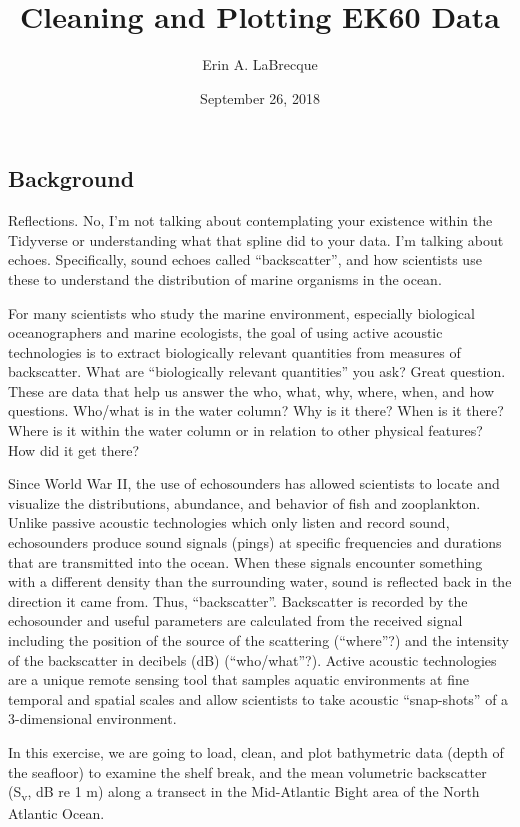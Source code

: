 \documentclass[]{article}
\title{Cleaning and Plotting EK60 Data}
\author{Erin A. LaBrecque}
\date{September 26, 2018}
\begin{document}
\maketitle

\hypertarget{background}{%
\subsection{Background}\label{background}}

Reflections. No, I'm not talking about contemplating your existence
within the Tidyverse or understanding what that spline did to your data.
I'm talking about echoes. Specifically, sound echoes called
``backscatter'', and how scientists use these to understand the
distribution of marine organisms in the ocean.

For many scientists who study the marine environment, especially
biological oceanographers and marine ecologists, the goal of using
active acoustic technologies is to extract biologically relevant
quantities from measures of backscatter. What are ``biologically
relevant quantities'' you ask? Great question. These are data that help
us answer the who, what, why, where, when, and how questions. Who/what
is in the water column? Why is it there? When is it there? Where is it
within the water column or in relation to other physical features? How
did it get there?

Since World War II, the use of echosounders has allowed scientists to
locate and visualize the distributions, abundance, and behavior of fish
and zooplankton. Unlike passive acoustic technologies which only listen
and record sound, echosounders produce sound signals (pings) at specific
frequencies and durations that are transmitted into the ocean. When
these signals encounter something with a different density than the
surrounding water, sound is reflected back in the direction it came
from. Thus, ``backscatter''. Backscatter is recorded by the echosounder
and useful parameters are calculated from the received signal including
the position of the source of the scattering (``where''?) and the
intensity of the backscatter in decibels (dB) (``who/what''?). Active
acoustic technologies are a unique remote sensing tool that samples
aquatic environments at fine temporal and spatial scales and allow
scientists to take acoustic ``snap-shots'' of a 3-dimensional
environment.

In this exercise, we are going to load, clean, and plot bathymetric data
(depth of the seafloor) to examine the shelf break, and the mean
volumetric backscatter (S\textsubscript{v}, dB re 1 m) along a transect
in the Mid-Atlantic Bight area of the North Atlantic Ocean.
\end{document}
